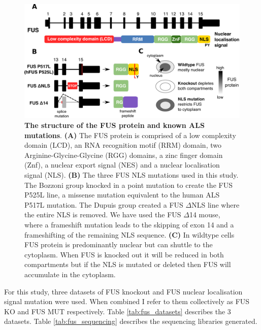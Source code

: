 \begin{figure}[h!]
	\centering
	\includegraphics[width=\textwidth]{Figures/06_fus_meta/FUS_structure_mutations.png}
	\caption[The structure of the FUS protein and known ALS mutations]{
		\textbf{The structure of the FUS protein and known ALS mutations}.
		\textbf{(A)} The FUS protein is comprised of a low complexity domain (LCD), an RNA recognition motif (RRM) domain, two Arginine-Glycine-Glycine (RGG) domains, a zinc finger domain (Znf), a nuclear export signal (NES) and a nuclear localisation signal (NLS). 
		\textbf{(B)} The three FUS NLS mutations used in this study. The Bozzoni group knocked in a point mutation to create the FUS P525L line, a missense mutation equivalent to the human ALS P517L mutation.  
	The Dupuis group created a FUS $\Delta$NLS line where the entire NLS is removed.  
	We have used the FUS $\Delta$14 mouse, where a frameshift mutation leads to the skipping of exon 14 and a frameshifting of the remaining NLS sequence.
	\textbf{(C)} In wildtype  cells FUS protein is predominantly nuclear but can shuttle to the cytoplasm. When FUS is knocked out it will be reduced in both compartments but if the NLS is mutated or deleted then FUS will accumulate in the cytoplasm.
}
	\label{fig:fus_structure}
\end{figure}


For this study, three datasets of FUS knockout and FUS nuclear localisation signal mutation were used. When combined I refer to them collectively as FUS KO and FUS MUT respectively. Table \ref{tab:fus_datasets} describes the 3 datasets. Table \ref{tab:fus_sequencing} describes the sequencing libraries generated.

